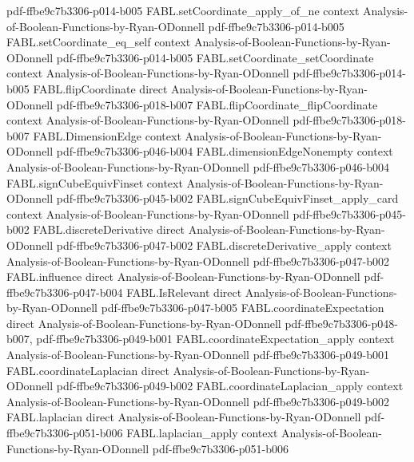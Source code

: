 \begin{theorem}
  {pdf-ffbe9c7b3306-p014-b005}
\proofstep
  {FABL.setCoordinate_apply_of_ne}
  {context}
  {Analysis-of-Boolean-Functions-by-Ryan-ODonnell}
  {pdf-ffbe9c7b3306-p014-b005}
\proofstep
  {FABL.setCoordinate_eq_self}
  {context}
  {Analysis-of-Boolean-Functions-by-Ryan-ODonnell}
  {pdf-ffbe9c7b3306-p014-b005}
\proofstep
  {FABL.setCoordinate_setCoordinate}
  {context}
  {Analysis-of-Boolean-Functions-by-Ryan-ODonnell}
  {pdf-ffbe9c7b3306-p014-b005}
\proofstep
  {FABL.flipCoordinate}
  {direct}
  {Analysis-of-Boolean-Functions-by-Ryan-ODonnell}
  {pdf-ffbe9c7b3306-p018-b007}
\proofstep
  {FABL.flipCoordinate_flipCoordinate}
  {context}
  {Analysis-of-Boolean-Functions-by-Ryan-ODonnell}
  {pdf-ffbe9c7b3306-p018-b007}
\proofstep
  {FABL.DimensionEdge}
  {context}
  {Analysis-of-Boolean-Functions-by-Ryan-ODonnell}
  {pdf-ffbe9c7b3306-p046-b004}
\proofstep
  {FABL.dimensionEdgeNonempty}
  {context}
  {Analysis-of-Boolean-Functions-by-Ryan-ODonnell}
  {pdf-ffbe9c7b3306-p046-b004}
\proofstep
  {FABL.signCubeEquivFinset}
  {context}
  {Analysis-of-Boolean-Functions-by-Ryan-ODonnell}
  {pdf-ffbe9c7b3306-p045-b002}
\proofstep
  {FABL.signCubeEquivFinset_apply_card}
  {context}
  {Analysis-of-Boolean-Functions-by-Ryan-ODonnell}
  {pdf-ffbe9c7b3306-p045-b002}
\proofstep
  {FABL.discreteDerivative}
  {direct}
  {Analysis-of-Boolean-Functions-by-Ryan-ODonnell}
  {pdf-ffbe9c7b3306-p047-b002}
\proofstep
  {FABL.discreteDerivative_apply}
  {context}
  {Analysis-of-Boolean-Functions-by-Ryan-ODonnell}
  {pdf-ffbe9c7b3306-p047-b002}
\proofstep
  {FABL.influence}
  {direct}
  {Analysis-of-Boolean-Functions-by-Ryan-ODonnell}
  {pdf-ffbe9c7b3306-p047-b004}
\proofstep
  {FABL.IsRelevant}
  {direct}
  {Analysis-of-Boolean-Functions-by-Ryan-ODonnell}
  {pdf-ffbe9c7b3306-p047-b005}
\proofstep
  {FABL.coordinateExpectation}
  {direct}
  {Analysis-of-Boolean-Functions-by-Ryan-ODonnell}
  {pdf-ffbe9c7b3306-p048-b007,
    pdf-ffbe9c7b3306-p049-b001}
\proofstep
  {FABL.coordinateExpectation_apply}
  {context}
  {Analysis-of-Boolean-Functions-by-Ryan-ODonnell}
  {pdf-ffbe9c7b3306-p049-b001}
\proofstep
  {FABL.coordinateLaplacian}
  {direct}
  {Analysis-of-Boolean-Functions-by-Ryan-ODonnell}
  {pdf-ffbe9c7b3306-p049-b002}
\proofstep
  {FABL.coordinateLaplacian_apply}
  {context}
  {Analysis-of-Boolean-Functions-by-Ryan-ODonnell}
  {pdf-ffbe9c7b3306-p049-b002}
\proofstep
  {FABL.laplacian}
  {direct}
  {Analysis-of-Boolean-Functions-by-Ryan-ODonnell}
  {pdf-ffbe9c7b3306-p051-b006}
\proofstep
  {FABL.laplacian_apply}
  {context}
  {Analysis-of-Boolean-Functions-by-Ryan-ODonnell}
  {pdf-ffbe9c7b3306-p051-b006}

\end{theorem}
